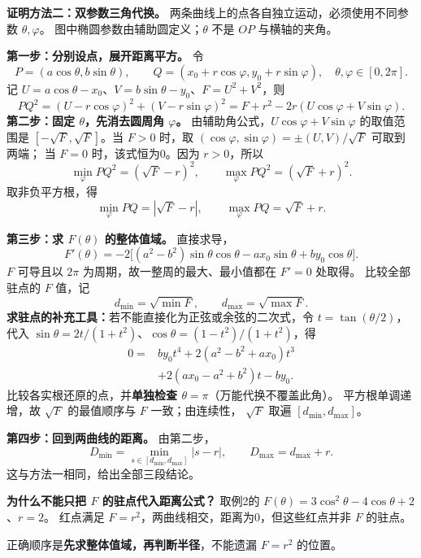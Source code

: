 \begin{proofbox}
\begin{minipage}{\linewidth}
\textbf{证明方法二：双参数三角代换。}
两条曲线上的点各自独立运动，必须使用不同参数 $\theta,\varphi$。
图中椭圆参数由辅助圆定义；$\theta$ 不是 $OP$ 与横轴的夹角。

\end{minipage}
\textbf{第一步：分别设点，展开距离平方。}
令
\[
 P=(a\cos\theta,b\sin\theta),\qquad
 Q=(x_0+r\cos\varphi,y_0+r\sin\varphi),
 \quad\theta,\varphi\in[0,2\pi].
\]
记 $U=a\cos\theta-x_0$、$V=b\sin\theta-y_0$、$F=U^2+V^2$，则
\[
 PQ^2=(U-r\cos\varphi)^2+(V-r\sin\varphi)^2
 =F+r^2-2r(U\cos\varphi+V\sin\varphi).
\]
\textbf{第二步：固定 $\theta$，先消去圆周角 $\varphi$。}
由辅助角公式，$U\cos\varphi+V\sin\varphi$ 的取值范围是
$[-\sqrt F,\sqrt F]$。当 $F>0$ 时，取
$(\cos\varphi,\sin\varphi)=\pm(U,V)/\sqrt F$ 可取到两端；
当 $F=0$ 时，该式恒为0。因为 $r>0$，所以
\[
 \min_{\varphi}PQ^2=(\sqrt F-r)^2,\qquad
 \max_{\varphi}PQ^2=(\sqrt F+r)^2.
\]
取非负平方根，得
\[
 \min_{\varphi}PQ=|\sqrt F-r|,\qquad
 \max_{\varphi}PQ=\sqrt F+r.
\]

\textbf{第三步：求 $F(\theta)$ 的整体值域。}
直接求导，
\[
 F'(\theta)=-2\bigl[(a^2-b^2)\sin\theta\cos\theta
 -ax_0\sin\theta+by_0\cos\theta\bigr].
\]
$F$ 可导且以 $2\pi$ 为周期，故一整周的最大、最小值都在 $F'=0$ 处取得。
比较全部驻点的 $F$ 值，记
\[
 d_{\min}=\sqrt{\min F},\qquad d_{\max}=\sqrt{\max F}.
\]
\textbf{求驻点的补充工具：}若不能直接化为正弦或余弦的二次式，令
$t=\tan(\theta/2)$，代入
$\sin\theta=2t/(1+t^2)$、$\cos\theta=(1-t^2)/(1+t^2)$，得
\[
 \begin{aligned}
 0={}&by_0t^4+2(a^2-b^2+ax_0)t^3\\
 &+2(ax_0-a^2+b^2)t-by_0.
 \end{aligned}
\]
比较各实根还原的点，并\textbf{单独检查 $\theta=\pi$}（万能代换不覆盖此角）。
平方根单调递增，故 $\sqrt F$ 的最值顺序与 $F$ 一致；由连续性，
$\sqrt F$ 取遍 $[d_{\min},d_{\max}]$。

\textbf{第四步：回到两曲线的距离。}
由第二步，
\[
 D_{\min}=\min_{s\in[d_{\min},d_{\max}]}|s-r|,
 \qquad D_{\max}=d_{\max}+r.
\]
这与方法一相同，给出全部三段结论。

\begin{minipage}{\linewidth}
\textbf{为什么不能只把 $F$ 的驻点代入距离公式？}
取例2的 $F(\theta)=3\cos^2\theta-4\cos\theta+2$、$r=2$。
红点满足 $F=r^2$，两曲线相交，距离为0，但这些红点并非 $F$ 的驻点。

\end{minipage}
正确顺序是\textbf{先求整体值域，再判断半径}，不能遗漏 $F=r^2$ 的位置。
\end{proofbox}
